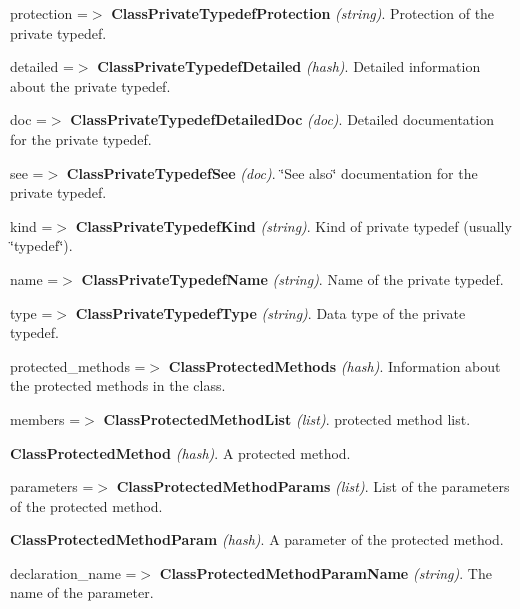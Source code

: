 \begin{DoxyItemize}
\begin{DoxyItemize}
\begin{DoxyItemize}
\begin{DoxyItemize}
\begin{DoxyItemize}
\begin{DoxyItemize}
\begin{DoxyItemize}
\item protection =$>$ {\bfseries ClassPrivateTypedefProtection} {\itshape (string)\/}. Protection of the private typedef. 
\item detailed =$>$ {\bfseries ClassPrivateTypedefDetailed} {\itshape (hash)\/}. Detailed information about the private typedef. 
\begin{DoxyItemize}
\item doc =$>$ {\bfseries ClassPrivateTypedefDetailedDoc} {\itshape (doc)\/}. Detailed documentation for the private typedef. 
\item see =$>$ {\bfseries ClassPrivateTypedefSee} {\itshape (doc)\/}. \char`\"{}See also\char`\"{} documentation for the private typedef. 
\end{DoxyItemize}
\item kind =$>$ {\bfseries ClassPrivateTypedefKind} {\itshape (string)\/}. Kind of private typedef (usually \char`\"{}typedef\char`\"{}). 
\item name =$>$ {\bfseries ClassPrivateTypedefName} {\itshape (string)\/}. Name of the private typedef. 
\item type =$>$ {\bfseries ClassPrivateTypedefType} {\itshape (string)\/}. Data type of the private typedef. 
\end{DoxyItemize}
\end{DoxyItemize}
\end{DoxyItemize}
\item protected\_\-methods =$>$ {\bfseries ClassProtectedMethods} {\itshape (hash)\/}. Information about the protected methods in the class. 
\begin{DoxyItemize}
\item members =$>$ {\bfseries ClassProtectedMethodList} {\itshape (list)\/}. protected method list. 
\begin{DoxyItemize}
\item {\bfseries ClassProtectedMethod} {\itshape (hash)\/}. A protected method. 
\begin{DoxyItemize}
\item parameters =$>$ {\bfseries ClassProtectedMethodParams} {\itshape (list)\/}. List of the parameters of the protected method. 
\begin{DoxyItemize}
\item {\bfseries ClassProtectedMethodParam} {\itshape (hash)\/}. A parameter of the protected method. 
\begin{DoxyItemize}
\item declaration\_\-name =$>$ {\bfseries ClassProtectedMethodParamName} {\itshape (string)\/}. The name of the parameter. 

\end{DoxyItemize}
\end{DoxyItemize}
\end{DoxyItemize}
\end{DoxyItemize}
\end{DoxyItemize}
\end{DoxyItemize}
\end{DoxyItemize}
\end{DoxyItemize}
\end{DoxyItemize}

